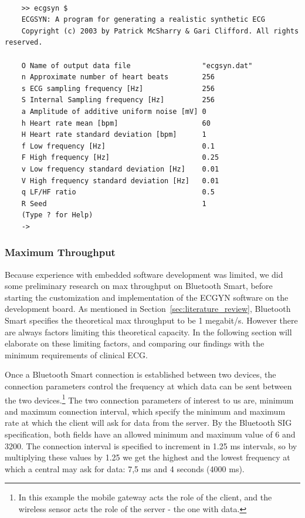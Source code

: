 \begin{lstlisting}[caption={ECGSYN Commando Line Interface (CLI)}, label={lst:ecgsyn:terminal}, basicstyle=\tiny]

    >> ecgsyn $
    ECGSYN: A program for generating a realistic synthetic ECG
    Copyright (c) 2003 by Patrick McSharry & Gari Clifford. All rights reserved.
     
    O Name of output data file                 "ecgsyn.dat"
    n Approximate number of heart beats        256
    s ECG sampling frequency [Hz]              256
    S Internal Sampling frequency [Hz]         256
    a Amplitude of additive uniform noise [mV] 0
    h Heart rate mean [bpm]                    60
    H Heart rate standard deviation [bpm]      1
    f Low frequency [Hz]                       0.1
    F High frequency [Hz]                      0.25
    v Low frequency standard deviation [Hz]    0.01
    V High frequency standard deviation [Hz]   0.01
    q LF/HF ratio                              0.5
    R Seed                                     1
    (Type ? for Help)
    ->

\end{lstlisting}

\subsubsection{Maximum Throughput} %
\label{ssub:maximum_throughput}

Because experience with embedded software development was limited, we did some preliminary research on max throughput on Bluetooth Smart, before starting the customization and implementation of the ECGYN software on the development board. As mentioned in Section~\ref{sec:literature_review}, Bluetooth Smart specifies the theoretical max throughput to be 1 megabit/s. However there are always factors limiting this theoretical capacity. In the following section will elaborate on these limiting factors, and comparing our findings with the minimum requirements of clinical ECG.

Once a Bluetooth Smart connection is established between two devices, the connection parameters \cite{newRef:59} control the frequency at which data can be sent between the two devices.\footnote{ In this example the mobile gateway acts the role of the client, and the wireless sensor acts the role of the server - the one with data.} The two connection parameters of interest to us are, minimum and maximum connection interval, which specify the minimum and maximum rate at which the client will ask for data from the server. By the Bluetooth SIG specification, both fields have an allowed minimum and maximum value of 6 and 3200. The connection interval is specified to increment in 1.25 ms intervals, so by multiplying these values by 1.25 we get the highest and the lowest frequency at which a central may ask for data: 7,5 ms and 4 seconds (4000 ms).

